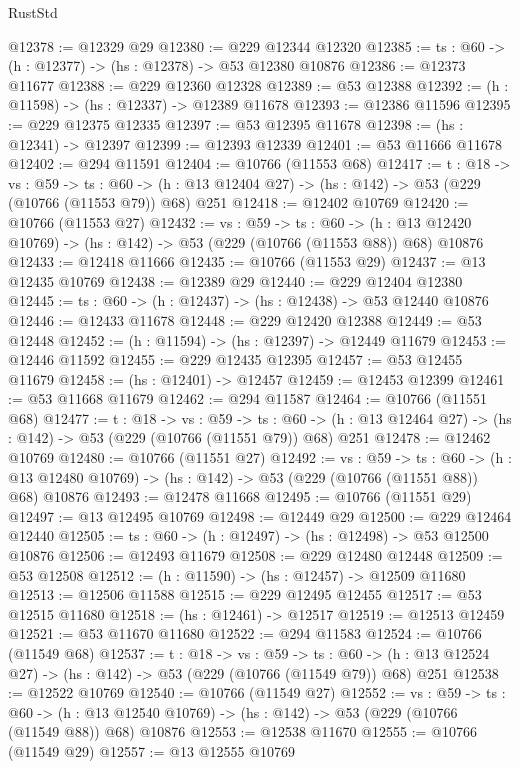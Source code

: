\begin{lexlean}{RustStd}
\begin{coremodule}
@12378 := @12329 @29
@12380 := @229 @12344 @12320
@12385 := {ts : @60} -> (h : @12377) -> (hs : @12378) -> @53 @12380 @10876
@12386 := @12373 @11677
@12388 := @229 @12360 @12328
@12389 := @53 @12388
@12392 := (h : @11598) -> (hs : @12337) -> @12389 @11678
@12393 := @12386 @11596
@12395 := @229 @12375 @12335
@12397 := @53 @12395 @11678
@12398 := (hs : @12341) -> @12397
@12399 := @12393 @12339
@12401 := @53 @11666 @11678
@12402 := @294 @11591
@12404 := @10766 (@11553 @68)
@12417 := {t : @18} ->
  {vs : @59} ->
  {ts : @60} -> (h : @13 @12404 @27) -> (hs : @142) -> @53 (@229 (@10766 (@11553 @79)) @68) @251
@12418 := @12402 @10769
@12420 := @10766 (@11553 @27)
@12432 := {vs : @59} ->
  {ts : @60} ->
  (h : @13 @12420 @10769) -> (hs : @142) -> @53 (@229 (@10766 (@11553 @88)) @68) @10876
@12433 := @12418 @11666
@12435 := @10766 (@11553 @29)
@12437 := @13 @12435 @10769
@12438 := @12389 @29
@12440 := @229 @12404 @12380
@12445 := {ts : @60} -> (h : @12437) -> (hs : @12438) -> @53 @12440 @10876
@12446 := @12433 @11678
@12448 := @229 @12420 @12388
@12449 := @53 @12448
@12452 := (h : @11594) -> (hs : @12397) -> @12449 @11679
@12453 := @12446 @11592
@12455 := @229 @12435 @12395
@12457 := @53 @12455 @11679
@12458 := (hs : @12401) -> @12457
@12459 := @12453 @12399
@12461 := @53 @11668 @11679
@12462 := @294 @11587
@12464 := @10766 (@11551 @68)
@12477 := {t : @18} ->
  {vs : @59} ->
  {ts : @60} -> (h : @13 @12464 @27) -> (hs : @142) -> @53 (@229 (@10766 (@11551 @79)) @68) @251
@12478 := @12462 @10769
@12480 := @10766 (@11551 @27)
@12492 := {vs : @59} ->
  {ts : @60} ->
  (h : @13 @12480 @10769) -> (hs : @142) -> @53 (@229 (@10766 (@11551 @88)) @68) @10876
@12493 := @12478 @11668
@12495 := @10766 (@11551 @29)
@12497 := @13 @12495 @10769
@12498 := @12449 @29
@12500 := @229 @12464 @12440
@12505 := {ts : @60} -> (h : @12497) -> (hs : @12498) -> @53 @12500 @10876
@12506 := @12493 @11679
@12508 := @229 @12480 @12448
@12509 := @53 @12508
@12512 := (h : @11590) -> (hs : @12457) -> @12509 @11680
@12513 := @12506 @11588
@12515 := @229 @12495 @12455
@12517 := @53 @12515 @11680
@12518 := (hs : @12461) -> @12517
@12519 := @12513 @12459
@12521 := @53 @11670 @11680
@12522 := @294 @11583
@12524 := @10766 (@11549 @68)
@12537 := {t : @18} ->
  {vs : @59} ->
  {ts : @60} -> (h : @13 @12524 @27) -> (hs : @142) -> @53 (@229 (@10766 (@11549 @79)) @68) @251
@12538 := @12522 @10769
@12540 := @10766 (@11549 @27)
@12552 := {vs : @59} ->
  {ts : @60} ->
  (h : @13 @12540 @10769) -> (hs : @142) -> @53 (@229 (@10766 (@11549 @88)) @68) @10876
@12553 := @12538 @11670
@12555 := @10766 (@11549 @29)
@12557 := @13 @12555 @10769

\end{coremodule}
\end{lexlean}

